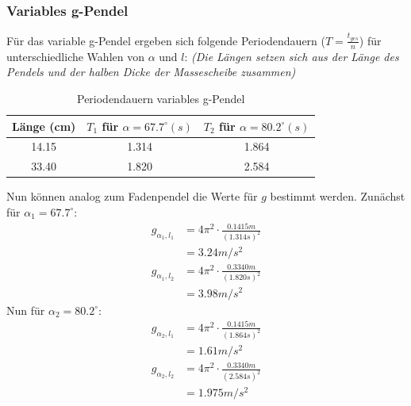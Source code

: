 \documentclass{report}
\begin{document}
\subsubsection{Variables g-Pendel}
Für das variable g-Pendel ergeben sich folgende Periodendauern ($T = \frac{t_{ges}}{n}$) für unterschiedliche Wahlen von $\alpha$ und $l$:
\textit{(Die Längen setzen sich aus der Länge des Pendels und der halben Dicke der Massescheibe zusammen)}
\begin{table}[H]
    \centering
    \caption{Periodendauern variables g-Pendel}
    \label{tab:TgPendel}
    \begin{tabular}{c | c c}
        Länge (cm) & $T_1$ für $\alpha = 67.7^\circ (s)$ & $ T_2$ für $\alpha = 80.2^\circ (s)$ \\
        \hline
        14.15 & 1.314 & 1.864 \\
        33.40 & 1.820 & 2.584 \\
    \end{tabular}
\end{table}
\noindent
Nun können analog zum Fadenpendel die Werte für $g$ bestimmt werden.
Zunächst für $\alpha_1 = 67.7^\circ$:
\begin{equation}
    \begin{split}
        g_{\alpha_1,l_1} &= 4\pi^2 \cdot \frac{0.1415m}{(1.314s)^2} \\
                         &= \boxed{3.24m/s^2}
    \end{split}
\end{equation}
\begin{equation}
    \begin{split}
        g_{\alpha_1,l_2} &= 4\pi^2 \cdot \frac{0.3340m}{(1.820s)^2} \\
                         &= \boxed{3.98m/s^2}
    \end{split}
\end{equation}
Nun für $\alpha_2 = 80.2^\circ$:
\begin{equation}
    \begin{split}
        g_{\alpha_2,l_1} &= 4\pi^2 \cdot \frac{0.1415m}{(1.864s)^2} \\
                       &= \boxed{1.61m/s^2}
    \end{split}
\end{equation}
\begin{equation}
    \begin{split}
        g_{\alpha_2,l_2} &= 4\pi^2 \cdot \frac{0.3340m}{(2.584s)^2} \\
                        &= \boxed{1.975 m/s^2}
    \end{split}
\end{equation}
\end{document}
